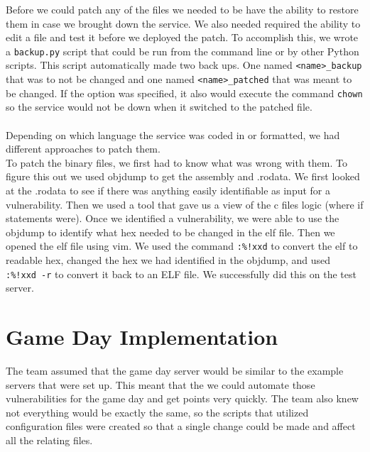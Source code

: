 \documentclass[12pt]{report}
\begin{document}
\noindent Before we could patch any of the files we needed to be have the ability to restore them in case we brought down the service. We also needed required the ability to edit a file and test it before we deployed the patch. To accomplish this, we wrote a \texttt{backup.py} script that could be run from the command line or by other Python scripts. 
This script automatically made two back ups. One named \texttt{<name>\_backup} that was to not be changed and one named \texttt{<name>\_patched} that was meant to be changed. If the option was specified, it also would execute the command \texttt{chown} so the service would not be down when it switched to the patched file.\\\\

\noindent Depending on which language the service was coded in or formatted, we had different approaches to patch them.\\

\noindent To patch the binary files, we first had to know what was wrong with them. To figure this out we used objdump to get the assembly and .rodata. We first looked at the .rodata to see if there was anything easily identifiable as input for a vulnerability. Then we used a tool that gave us a view of the c files logic (where if statements were). Once we identified a vulnerability, we were able to use the objdump to identify what hex needed to be changed in the elf file. Then we opened the elf file using vim. We used the command \texttt{:\%!xxd} to convert the elf to readable hex, changed the hex we had identified in the objdump, and used \texttt{:\%!xxd -r} to convert it back to an ELF file. We successfully did this on the test server.

\section*{Game Day Implementation}
The team assumed that the game day server would be similar to the example servers that were set up. This meant that the we could automate those vulnerabilities for the game day and get points very quickly.
The team also knew not everything would be exactly the same, so the scripts that utilized configuration files were created so that a single change could be made and affect all the relating files.\\
\end{document}
